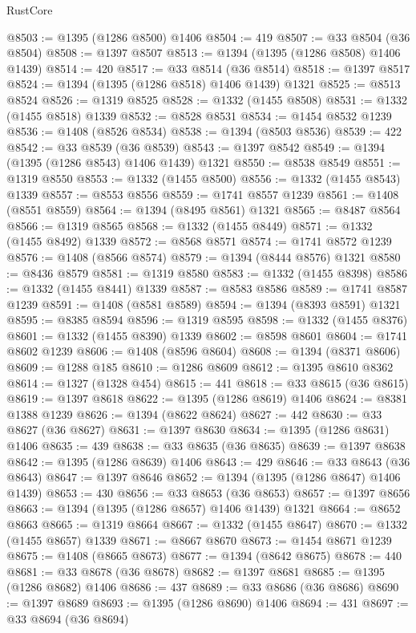 \begin{lexlean}{RustCore}
\begin{coremodule}
@8503 := @1395 (@1286 @8500) @1406
@8504 := 419
@8507 := @33 @8504 (@36 @8504)
@8508 := @1397 @8507
@8513 := @1394 (@1395 (@1286 @8508) @1406 @1439)
@8514 := 420
@8517 := @33 @8514 (@36 @8514)
@8518 := @1397 @8517
@8524 := @1394 (@1395 (@1286 @8518) @1406 @1439) @1321
@8525 := @8513 @8524
@8526 := @1319 @8525
@8528 := @1332 (@1455 @8508)
@8531 := @1332 (@1455 @8518) @1339
@8532 := @8528 @8531
@8534 := @1454 @8532 @1239
@8536 := @1408 (@8526 @8534)
@8538 := @1394 (@8503 @8536)
@8539 := 422
@8542 := @33 @8539 (@36 @8539)
@8543 := @1397 @8542
@8549 := @1394 (@1395 (@1286 @8543) @1406 @1439) @1321
@8550 := @8538 @8549
@8551 := @1319 @8550
@8553 := @1332 (@1455 @8500)
@8556 := @1332 (@1455 @8543) @1339
@8557 := @8553 @8556
@8559 := @1741 @8557 @1239
@8561 := @1408 (@8551 @8559)
@8564 := @1394 (@8495 @8561) @1321
@8565 := @8487 @8564
@8566 := @1319 @8565
@8568 := @1332 (@1455 @8449)
@8571 := @1332 (@1455 @8492) @1339
@8572 := @8568 @8571
@8574 := @1741 @8572 @1239
@8576 := @1408 (@8566 @8574)
@8579 := @1394 (@8444 @8576) @1321
@8580 := @8436 @8579
@8581 := @1319 @8580
@8583 := @1332 (@1455 @8398)
@8586 := @1332 (@1455 @8441) @1339
@8587 := @8583 @8586
@8589 := @1741 @8587 @1239
@8591 := @1408 (@8581 @8589)
@8594 := @1394 (@8393 @8591) @1321
@8595 := @8385 @8594
@8596 := @1319 @8595
@8598 := @1332 (@1455 @8376)
@8601 := @1332 (@1455 @8390) @1339
@8602 := @8598 @8601
@8604 := @1741 @8602 @1239
@8606 := @1408 (@8596 @8604)
@8608 := @1394 (@8371 @8606)
@8609 := @1288 @185
@8610 := @1286 @8609
@8612 := @1395 @8610 @8362
@8614 := @1327 (@1328 @454)
@8615 := 441
@8618 := @33 @8615 (@36 @8615)
@8619 := @1397 @8618
@8622 := @1395 (@1286 @8619) @1406
@8624 := @8381 @1388 @1239
@8626 := @1394 (@8622 @8624)
@8627 := 442
@8630 := @33 @8627 (@36 @8627)
@8631 := @1397 @8630
@8634 := @1395 (@1286 @8631) @1406
@8635 := 439
@8638 := @33 @8635 (@36 @8635)
@8639 := @1397 @8638
@8642 := @1395 (@1286 @8639) @1406
@8643 := 429
@8646 := @33 @8643 (@36 @8643)
@8647 := @1397 @8646
@8652 := @1394 (@1395 (@1286 @8647) @1406 @1439)
@8653 := 430
@8656 := @33 @8653 (@36 @8653)
@8657 := @1397 @8656
@8663 := @1394 (@1395 (@1286 @8657) @1406 @1439) @1321
@8664 := @8652 @8663
@8665 := @1319 @8664
@8667 := @1332 (@1455 @8647)
@8670 := @1332 (@1455 @8657) @1339
@8671 := @8667 @8670
@8673 := @1454 @8671 @1239
@8675 := @1408 (@8665 @8673)
@8677 := @1394 (@8642 @8675)
@8678 := 440
@8681 := @33 @8678 (@36 @8678)
@8682 := @1397 @8681
@8685 := @1395 (@1286 @8682) @1406
@8686 := 437
@8689 := @33 @8686 (@36 @8686)
@8690 := @1397 @8689
@8693 := @1395 (@1286 @8690) @1406
@8694 := 431
@8697 := @33 @8694 (@36 @8694)

\end{coremodule}
\end{lexlean}
